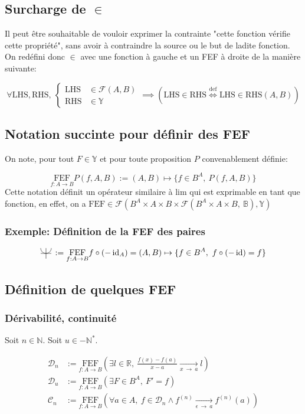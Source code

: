 \documentclass{article}
\newcommand{\R}{{\mathbb R}}
\newcommand{\Y}{{\mathbb Y}}
\newcommand{\FEF}[1]{\underset{f:A\to B}{\text{FEF}}#1}
\newcommand{\N}{{\mathbb N}}
\newcommand{\cC}{{\mathcal C}}
\newcommand{\cD}{{\mathcal D}}
\newcommand{\cF}{{\mathcal F}}
\newcommand{\goesto}[2]{\xrightarrow[#1\:\to\:#2]{}}
\newcommand{\id}{\operatorname{id}}
\newcommand{\evenfunctions}{%
	\begin{tikzpicture}[scale=1.5, baseline=-0.5ex]%
		\draw (-1ex,0) -- (1ex,0);%
		\draw (0,-1ex) -- (0, 1ex);%
		\draw (0ex, 0ex) arc (-90:0:1ex);%
		\draw (0ex, 0ex) arc (90:0:-1ex);%
	\end{tikzpicture}\,%
}
\begin{document}
\subsection{Surcharge de $\in$}
Il peut être souhaitable de vouloir exprimer la contrainte "cette fonction vérifie cette propriété", sans avoir à contraindre la source ou le but de ladite fonction.
On redéfini donc $\in$ avec une fonction à gauche et un FEF à droite de la manière suivante:

\[
	\forall \text{LHS}, \text{RHS},\ \begin{cases}
		\text{LHS} &\in \cF(A, B) \\
		\text{RHS} &\in \Y
	\end{cases} \implies \left( \text{LHS}\in \text{RHS} \overset{\text{def}}{\iff} \text{LHS}\in \text{RHS}(A, B) \right) 
\] 

\subsection{Notation succinte pour définir des FEF}

On note, pour tout $F \in \Y$ et pour toute proposition $P$ convenablement définie:

\[
	\FEF{P(f, A, B)} := (A, B) \mapsto \{f\in B^A,\ P(f, A, B)\} 
\]
Cette notation définit un opérateur similaire à $\text{lim}$ qui est exprimable en tant que fonction, en effet, on a $\text{FEF} \in \cF(B^A \times A \times B \times \cF(B^A  \times A  \times  B,\ \mathbb{B}), \Y)$

\subsubsection{Exemple: Définition de la FEF des paires}

\[
	\evenfunctions := \FEF{f\circ (-\id_A)} = (A, B) \mapsto \{f\in B^A,\ f \circ (-\id) = f \} 
\] 

\subsection{Définition de quelques FEF}

\subsubsection{Dérivabilité, continuité}

Soit $n \in \N$. Soit $u \in -\N^\ast$.

\begin{align}
	\cD_n &:= \FEF{\left(\exists l\in \R,\ \frac{f(x)-f(a)}{x-a} \goesto{x}{a} l \right)}  \\
	\cD_u &:= \FEF{\left(\exists F\in B^A,\ F' = f\right)} \\
	\cC_n &:= \FEF{\left( \forall a\in A,\ f\in \cD_{n} \land f^{(n)} \goesto{\epsilon}{a} f^{(n)}(a) \right)  } 
\end{align}
\end{document}
